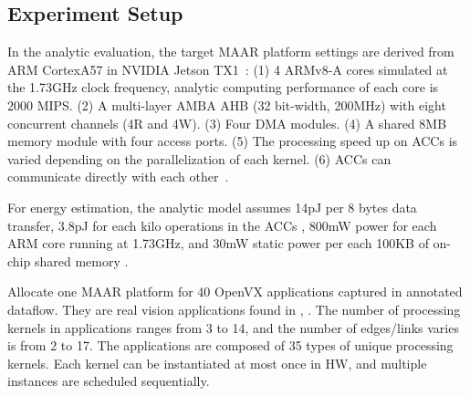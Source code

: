 \subsection{Experiment Setup}
\label{subsec:res-setup}

In the analytic evaluation, the target MAAR platform settings are derived from ARM CortexA57 in NVIDIA Jetson TX1~\cite{NVIDIA}: (1) 4 ARMv8-A cores simulated at the 1.73GHz clock frequency, analytic computing performance of each core is 2000 MIPS. (2) A multi-layer AMBA AHB (32 bit-width, 200MHz) with eight concurrent channels (4R and 4W). (3) Four DMA modules. (4) A shared 8MB memory module with four access ports. (5) The processing speed up on ACCs is varied depending on the parallelization of each kernel. (6) ACCs can communicate directly with each other~\cite{teimouri2016improving}. 

For energy estimation, the analytic model assumes 14pJ per 8 bytes data transfer, 3.8pJ for each kilo operations in the ACCs \cite{keckler2011gpus}, 800mW power for each ARM core running at 1.73GHz, and 30mW static power per each 100KB of on-chip shared memory \cite{malladi2012towards}.

Allocate one MAAR platform for 40 OpenVX applications captured in annotated dataflow. 
They are real vision applications found in \cite{Intel}, \cite{AMD}. 
The number of processing kernels in applications ranges from 3 to 14, and the number of edges/links varies is from 2 to 17. 
The applications are composed of 35 types of unique processing kernels.
Each kernel can be instantiated at most once in HW, and multiple instances are scheduled sequentially.